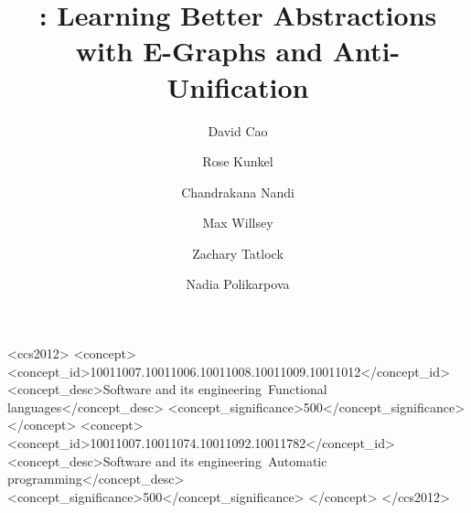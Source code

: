 \documentclass[acmsmall,screen,nonacm,review=false,timestamp=false]{acmart}
\begin{document}
\title{\tool: Learning Better Abstractions with E-Graphs and Anti-Unification}
\renewcommand{\shorttitle}{Learning Better Abstractions with E-Graphs and Anti-Unification}

\author{David Cao}

\author{Rose Kunkel}
\authornotemark[1]

\author{Chandrakana Nandi}

\author{Max Willsey}

\author{Zachary Tatlock}

\author{Nadia Polikarpova}

\renewcommand{\shortauthors}{Cao, D., Kunkel, R., Nandi, C., Willsey, M., Tatlock Z., Polikarpova, N.}



\begin{CCSXML}
  <ccs2012>
     <concept>
         <concept_id>10011007.10011006.10011008.10011009.10011012</concept_id>
         <concept_desc>Software and its engineering~Functional languages</concept_desc>
         <concept_significance>500</concept_significance>
     </concept>
     <concept>
         <concept_id>10011007.10011074.10011092.10011782</concept_id>
         <concept_desc>Software and its engineering~Automatic programming</concept_desc>
         <concept_significance>500</concept_significance>
      </concept>
   </ccs2012>
\end{CCSXML}
  
  

\maketitle
\end{document}
